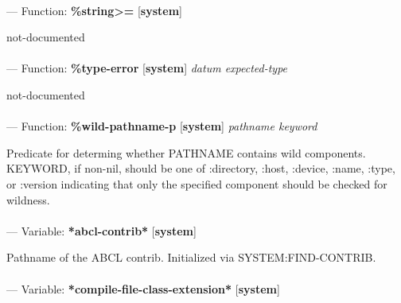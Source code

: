 \paragraph{}
\label{SYSTEM:STRING>=}
--- Function: \textbf{\%string>=} [\textbf{system}] \textit{}

\begin{adjustwidth}{5em}{5em}
not-documented
\end{adjustwidth}

\paragraph{}
\label{SYSTEM:TYPE-ERROR}
--- Function: \textbf{\%type-error} [\textbf{system}] \textit{datum expected-type}

\begin{adjustwidth}{5em}{5em}
not-documented
\end{adjustwidth}

\paragraph{}
\label{SYSTEM:WILD-PATHNAME-P}
--- Function: \textbf{\%wild-pathname-p} [\textbf{system}] \textit{pathname keyword}

\begin{adjustwidth}{5em}{5em}
Predicate for determing whether PATHNAME contains wild components.
KEYWORD, if non-nil, should be one of :directory, :host, :device,
:name, :type, or :version indicating that only the specified component
should be checked for wildness.
\end{adjustwidth}

\paragraph{}
\label{SYSTEM:*ABCL-CONTRIB*}
--- Variable: \textbf{*abcl-contrib*} [\textbf{system}] \textit{}

\begin{adjustwidth}{5em}{5em}
Pathname of the ABCL contrib.
Initialized via SYSTEM:FIND-CONTRIB.
\end{adjustwidth}

\paragraph{}
\label{SYSTEM:*COMPILE-FILE-CLASS-EXTENSION*}
--- Variable: \textbf{*compile-file-class-extension*} [\textbf{system}] \textit{}

